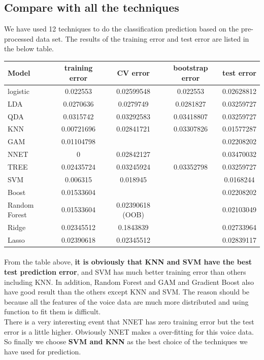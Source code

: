 \documentclass{article}%
\begin{document}
\subsection{Compare with all the techniques}
We have used 12 techniques to do the classification prediction based on the pre-processed data set. The results of the training error and test error are listed in the below table. \\
\setlength\extrarowheight{2pt}
\begin{tabular*}{\textwidth}{|l @{\extracolsep\fill}|c |c |c |c |}
  \hline
  Model & training error & CV error & bootstrap error & test error \\
  \hline 
  logistic & 0.022553 & 0.02599548 & 0.022553 & 0.02628812 \\
  LDA & 0.0270636 & 0.0279749 & 0.0281827 & 0.03259727 \\
  QDA & 0.0315742 & 0.03292583 & 0.03418807 & 0.03259727 \\
  KNN & 0.00721696 & 0.02841721 & 0.03307826 & 0.01577287 \\
  GAM & 0.01104798 &  &  & 0.02208202 \\
  NNET & 0 & 0.02842127 &  & 0.03470032 \\
  TREE & 0.02435724 & 0.03245924 & 0.03352798 & 0.03259727 \\
  SVM & 0.006315 & 0.018945 &  & 0.0168244 \\
  Boost & 0.01533604 &  &  & 0.02208202 \\
  Random Forest & 0.01533604 & 0.02390618 (OOB) &  & 0.02103049 \\
  Ridge & 0.02345512 & 0.1843839 &  & 0.02733964 \\
  Lasso & 0.02390618 & 0.02345512 &  & 0.02839117 \\
  \hline
\end{tabular*}
\paragraph{}
From the table above, \textbf{it is obviously that KNN and SVM have the best test prediction error}, and SVM has much better training error than others including KNN. In addition, Random Forest and GAM and Gradient Boost also have good result than the others except KNN and SVM. The reason should be because all the features of the voice data are much more distributed and using function to fit them is difficult. \\
\indent There is a very interesting event that NNET has zero training error but the test error is a little higher. Obviously NNET makes a over-fitting for this voice data.\\
\indent So finally we choose \textbf{SVM and KNN} as the best choice of the techniques we have used for prediction.
\end{document}
